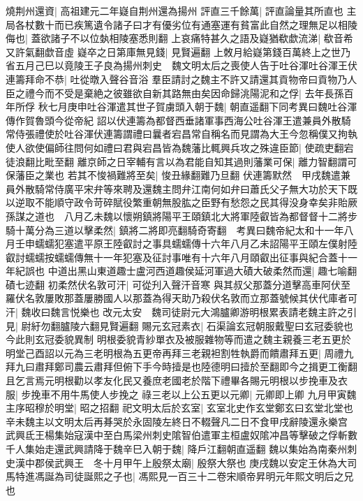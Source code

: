 燒荆州還資|{
	高祖建元二年嶷自荆州還為揚州}
評直三千餘萬|{
	評直論量其所直也}
主局各杖數十而已疾篤遺令諸子曰才有優劣位有通塞運有貧富此自然之理無足以相陵侮也|{
	蓋欲諸子不以位埶相陵塞悉則翻}
上哀痛特甚久之語及嶷猶欷歔流涕|{
	欷音希又許氣翻歔音虛}
嶷卒之日第庫無見錢|{
	見賢遍翻}
上敇月給嶷第錢百萬終上之世乃省五月己巳以竟陵王子良為揚州刺史　魏文明太后之喪使人告于吐谷渾吐谷渾王伏連籌拜命不恭|{
	吐從暾入聲谷音浴}
羣臣請討之魏主不許又請還其貢物帝曰貢物乃人臣之禮今而不受是棄絶之彼雖欲自新其路無由矣因命歸洮陽泥和之俘|{
	去年長孫百年所俘}
秋七月庚申吐谷渾遣其世子賀虜頭入朝于魏|{
	朝直遥翻下同考異曰魏吐谷渾傳作賀魯頭今從帝紀}
詔以伏連籌為都督西垂諸軍事西海公吐谷渾王遣兼員外散騎常侍張禮使於吐谷渾伏連籌謂禮曰曩者宕昌常自稱名而見謂為大王今忽稱僕又拘執使人欲使偏師往問何如禮曰君與宕昌皆為魏藩比輒興兵攻之殊違臣節|{
	使疏吏翻宕徒浪翻比毗至翻}
離京師之日宰輔有言以為君能自知其過則藩業可保|{
	離力智翻謂可保藩臣之業也}
若其不悛禍難將至矣|{
	悛丑緣翻難乃旦翻}
伏連籌默然　甲戌魏遣兼員外散騎常侍廣平宋弁等來聘及還魏主問弁江南何如弁曰蕭氏父子無大功於天下既以逆取不能順守政令苛碎賦役繁重朝無股肱之臣野有愁怨之民其得没身幸矣非貽厥孫謀之道也　八月乙未魏以懷朔鎮將陽平王頤鎮北大將軍陸叡皆為都督督十二將步騎十萬分為三道以擊柔然|{
	鎮將二將即亮翻騎奇寄翻　考異曰魏帝紀太和十一年八月壬申蠕蠕犯塞遣平原王陸叡討之事具蠕蠕傳十六年八月乙未詔陽平王頤左僕射陸叡討蠕蠕按蠕蠕傳無十一年犯塞及征討事唯有十六年八月頤叡出征事與紀合蓋十一年紀誤也}
中道出黑山東道趣士盧河西道趣侯延河軍過大磧大破柔然而還|{
	趣七喻翻磧七迹翻}
初柔然伏名敦可汗|{
	可從刋入聲汗音寒}
與其叔父那蓋分道擊高車阿伏至羅伏名敦屢敗那蓋屢勝國人以那蓋為得天助乃殺伏名敦而立那蓋號候其伏代庫者可汗|{
	魏收曰魏言悦樂也}
改元太安　魏司徒尉元大鴻臚卿游明根累表請老魏主許之引見|{
	尉紆勿翻臚陵六翻見賢遍翻}
賜元玄冠素衣|{
	石渠論玄冠朝服戴聖曰玄冠委貌也今此則玄冠委貌異制}
明根委貌青紗單衣及被服雜物等而遣之魏主親養三老五更於明堂己酉詔以元為三老明根為五更帝再拜三老親袒割牲執爵而饋肅拜五更|{
	周禮九拜九曰肅拜鄭司農云肅拜但俯下手今時撎是也陸德明曰撎於至翻即今之揖更工衡翻}
且乞言焉元明根勸以孝友化民又養庶老國老於階下禮畢各賜元明根以步挽車及衣服|{
	步挽車不用牛馬使人步挽之}
祿三老以上公五更以元卿|{
	元卿即上卿}
九月甲寅魏主序昭穆於明堂|{
	昭之招翻}
祀文明太后於玄室|{
	玄室北史作玄堂鄭玄曰玄堂北堂也}
辛未魏主以文明太后再朞哭於永固陵左終日不輟聲凡二日不食甲戌辭陵還永樂宫　武興氐王楊集始寇漢中至白馬梁州刺史隂智伯遣軍主桓盧奴隂冲昌等擊破之俘斬數千人集始走還武興請降于魏辛巳入朝于魏|{
	降戶江翻朝直遥翻}
魏以集始為南秦州刺史漢中郡侯武興王　冬十月甲午上殷祭太廟|{
	殷祭大祭也}
庚戌魏以安定王休為大司馬特進馮誕為司徒誕熙之子也|{
	馮熙見一百三十二卷宋順帝昇明元年熙文明后之兄也}
